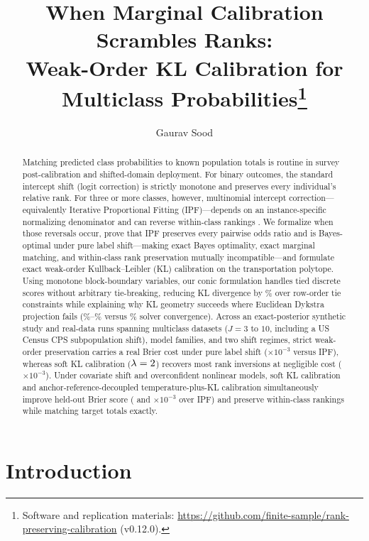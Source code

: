 \documentclass[11pt]{article}
\title{When Marginal Calibration Scrambles Ranks:\\
Weak-Order KL Calibration for Multiclass Probabilities\thanks{Software and replication materials: \url{https://github.com/finite-sample/rank-preserving-calibration} (v0.12.0).}}
\author{Gaurav Sood}
\date{}
\begin{document}
\maketitle

\begin{abstract}
Matching predicted class probabilities to known population totals is routine in survey post-calibration and shifted-domain deployment. For binary outcomes, the standard intercept shift (logit correction) is strictly monotone and preserves every individual's relative rank. For three or more classes, however, multinomial intercept correction---equivalently Iterative Proportional Fitting (IPF)---depends on an instance-specific normalizing denominator and can reverse within-class rankings \citep{mitchell2025}. We formalize when those reversals occur, prove that IPF preserves every pairwise odds ratio and is Bayes-optimal under pure label shift---making exact Bayes optimality, exact marginal matching, and within-class rank preservation mutually incompatible---and formulate exact weak-order Kullback--Leibler (KL) calibration on the transportation polytope. Using monotone block-boundary variables, our conic formulation handles tied discrete scores without arbitrary tie-breaking, reducing KL divergence by \TieKlDropPct\% over row-order tie constraints while explaining why KL geometry succeeds where Euclidean Dykstra projection fails (\RealKlSoftConvPct\%--\RealTempKlSoftConvPct\% versus \RealEucConvPct\% solver convergence). Across an exact-posterior synthetic study and \NumTotalRealRuns{} real-data runs spanning \NumDatasets{} multiclass datasets ($J=3$ to $10$, including a US Census CPS subpopulation shift), \NumModels{} model families, and two shift regimes, strict weak-order preservation carries a real Brier cost under pure label shift (\LabKlWeakDBrier{}$\times 10^{-3}$ versus IPF), whereas soft KL calibration ($\lambda=2$) recovers most rank inversions at negligible cost (\LabKlSoftDBrier{}$\times 10^{-3}$). Under covariate shift and overconfident nonlinear models, soft KL calibration and anchor-reference-decoupled temperature-plus-KL calibration simultaneously improve held-out Brier score (\CovKlSoftDBrier{} and \CovTempKlSoftDBrier{}$\times 10^{-3}$ over IPF) and preserve within-class rankings while matching target totals exactly.
\end{abstract}

\section{Introduction}
\end{document}
